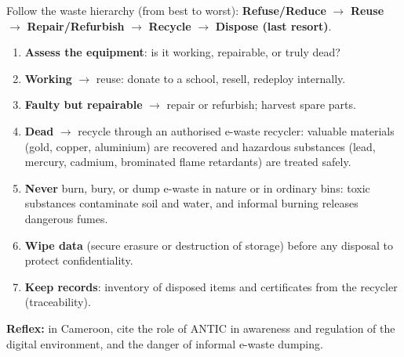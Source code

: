 \documentclass[11pt]{article}
\newcommand{\cle}[1]{{\popxbold\color{popdark}#1}}
\begin{document}
\begin{methode}
Follow the \cle{waste hierarchy} (from best to worst): \textbf{Refuse/Reduce} $\rightarrow$ \textbf{Reuse} $\rightarrow$ \textbf{Repair/Refurbish} $\rightarrow$ \textbf{Recycle} $\rightarrow$ \textbf{Dispose (last resort)}.
\begin{enumerate}
\item \textbf{Assess the equipment}: is it working, repairable, or truly dead?
\item \textbf{Working} $\rightarrow$ reuse: donate to a school, resell, redeploy internally.
\item \textbf{Faulty but repairable} $\rightarrow$ repair or refurbish; harvest spare parts.
\item \textbf{Dead} $\rightarrow$ recycle through an \cle{authorised e-waste recycler}: valuable materials (gold, copper, aluminium) are recovered and \cle{hazardous substances} (lead, mercury, cadmium, brominated flame retardants) are treated safely.
\item \textbf{Never} burn, bury, or dump e-waste in nature or in ordinary bins: toxic substances contaminate soil and water, and informal burning releases dangerous fumes.
\item \textbf{Wipe data} (secure erasure or destruction of storage) before any disposal to protect confidentiality.
\item \textbf{Keep records}: inventory of disposed items and certificates from the recycler (traceability).
\end{enumerate}
\textbf{Reflex:} in Cameroon, cite the role of \cle{ANTIC} in awareness and regulation of the digital environment, and the danger of informal e-waste dumping.
\end{methode}
\end{document}
